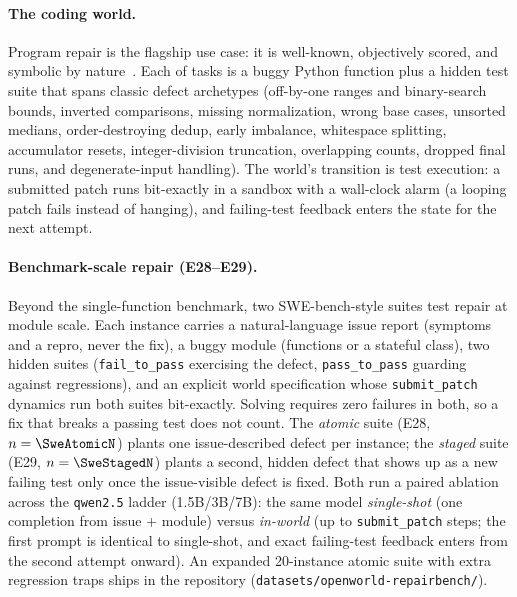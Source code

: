 \documentclass[11pt]{article}
\begin{document}
\paragraph{The coding world.} Program repair is the flagship use case: it is
well-known, objectively scored, and symbolic by nature~\cite{humaneval2021}.
Each of \NumTasks{} tasks is a buggy Python function plus a hidden test suite
that spans classic defect archetypes (off-by-one ranges and binary-search
bounds, inverted comparisons, missing normalization, wrong base cases,
unsorted medians, order-destroying dedup, early imbalance, whitespace
splitting, accumulator resets, integer-division truncation, overlapping
counts, dropped final runs, and degenerate-input handling). The world's
transition is test execution: a submitted patch runs bit-exactly in a
sandbox with a wall-clock alarm (a looping patch fails instead of hanging),
and failing-test feedback enters the state for the next attempt.

\paragraph{Benchmark-scale repair (E28--E29).} Beyond the single-function
benchmark, two SWE-bench-style suites test repair at module scale. Each
instance carries a natural-language issue report (symptoms and a repro, never
the fix), a buggy module (functions or a stateful class), two hidden suites
(\texttt{fail\_to\_pass} exercising the defect, \texttt{pass\_to\_pass}
guarding against regressions), and an explicit world specification whose
\texttt{submit\_patch} dynamics run both suites bit-exactly. Solving requires
zero failures in both, so a fix that breaks a passing test does not
count. The \emph{atomic} suite (E28, $n=\SweAtomicN$) plants one
issue-described defect per instance; the \emph{staged} suite (E29,
$n=\SweStagedN$) plants a second, hidden defect that shows up as a new
failing test only once the issue-visible defect is fixed. Both run a paired
ablation across the \texttt{qwen2.5} ladder (1.5B/3B/7B): the same model
\emph{single-shot} (one completion from issue + module) versus \emph{in-world}
(up to \SweBudget{} \texttt{submit\_patch} steps; the first prompt is
identical to single-shot, and exact failing-test feedback enters from the
second attempt onward). An expanded 20-instance atomic suite with extra
regression traps ships in the repository
(\texttt{datasets/openworld-repairbench/}).
\end{document}
